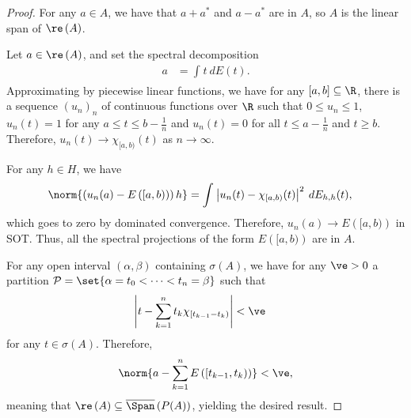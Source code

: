 \documentclass[10pt]{mypackage}
\begin{document}
\begin{proof}
  For any $a\in A$, we have that $a+a^{\ast}$ and $a-a^{\ast}$ are in $A$, so $A$ is the linear span of $\re\left( A \right)$.

  Let $a\in \re\left( A \right)$, and set the spectral decomposition
  \begin{align*}
    a &= \int_{}^{} t\:dE(t).
  \end{align*}
  Approximating by piecewise linear functions, we have for any $[a,b]\subseteq \R$, there is a sequence $\left( u_n \right)_n$ of continuous functions over $\R$ such that $0\leq u_n\leq 1$, $u_n(t) = 1$ for any $a\leq t \leq b-\frac{1}{n}$ and $u_n(t) = 0$ for all $t\leq a-\frac{1}{n}$ and $t\geq b$. Therefore, $u_n(t) \rightarrow \chi_{[a,b)}(t)$ as $n\rightarrow\infty$.

  For any $h\in H$, we have
  \begin{align*}
    \norm{\left( u_n(a)-E\left( [a,b) \right) \right)h} &= \int_{}^{} \left\vert u_n(t)-\chi_{[a,b)}(t) \right\vert^2\:dE_{h,h}(t),
  \end{align*}
  which goes to zero by dominated convergence. Therefore, $u_n(a)\rightarrow E\left( [a,b) \right)$ in SOT. Thus, all the spectral projections of the form $E\left( [a,b) \right)$ are in $A$.

  For any open interval $\left( \alpha,\beta \right)$ containing $\sigma(A)$, we have for any $\ve > 0$ a partition $ \mathcal{P} = \set{\alpha = t_0 < \cdots < t_n = \beta} $ such that
  \begin{align*}
    \left\vert t-\sum_{k=1}^{n}t_k\chi_{\left[t_{k-1}-t_k\right)} \right\vert &< \ve
  \end{align*}
  for any $t\in \sigma(A)$. Therefore,
  \begin{align*}
    \norm{a - \sum_{k=1}^{n}E\left( \left[ t_{k-1},t_k \right) \right)} < \ve,
  \end{align*}
  meaning that $\re\left( A \right)\subseteq \overline{\Span}\left( P(A) \right)$, yielding the desired result.
\end{proof}
\end{document}
